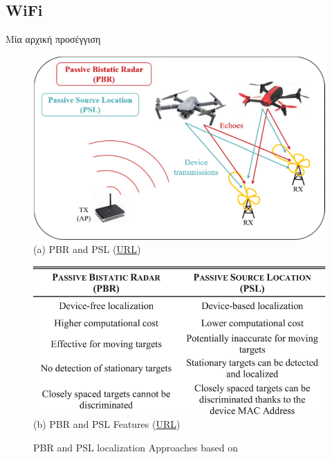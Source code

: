 \subsection{WiFi}
Μία αρχική προσέγγιση \cite{wifi-passive-active-drone-localization}

\begin{figure} [H]
	\centering
		\begin{minipage}{.48\textwidth}
			\centering
			\includegraphics[width=\linewidth]{Images/Related-Work/PBR-and-PSL-approaches.png}
			{(a) PBR and PSL (\href{https://ieeexplore.ieee.org/document/9253794/figures#figures}{URL})}
		\end{minipage}%
		\hspace*{+1cm}
		\begin{minipage}{.48\textwidth}
			\centering
			\includegraphics[width=\linewidth]{Images/Related-Work/PBR-and-PSL-Features.png}
			{(b) PBR and PSL Features (\href{https://ieeexplore.ieee.org/document/9253794/figures#figures}{URL})}
		\end{minipage}
    \hfill \break
    \decoRule
    \caption[PBR and PSL localization Approaches]{PBR and PSL localization Approaches based on \cite{wifi-passive-active-drone-localization}}
    \label{fig:[PBR-and-PSL]}
\end{figure}


